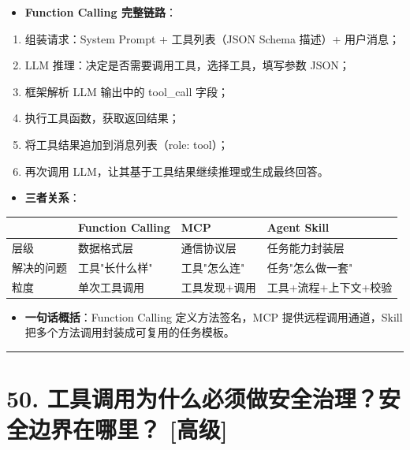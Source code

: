 \documentclass[9pt,a4paper,twocolumn]{ctexart}
\newcommand{\lvgao}{\usebox{\badgegaobox}}
\def\lvgao{[高级]}%
\begin{document}
\begin{itemize}[itemsep=1pt, topsep=2pt]
  \item \textbf{Function Calling 完整链路}：
\end{itemize}
\begin{enumerate}[itemsep=1pt, topsep=2pt]
  \item 组装请求：System Prompt + 工具列表（JSON Schema 描述）+ 用户消息；
  \item LLM 推理：决定是否需要调用工具，选择工具，填写参数 JSON；
  \item 框架解析 LLM 输出中的 tool\_call 字段；
  \item 执行工具函数，获取返回结果；
  \item 将工具结果追加到消息列表（role: tool）；
  \item 再次调用 LLM，让其基于工具结果继续推理或生成最终回答。
\end{enumerate}
\begin{itemize}[itemsep=1pt, topsep=2pt]
  \item \textbf{三者关系}：
\end{itemize}

{\footnotesize
\begin{tabular}{|p{}|p{}|p{}|p{}|}
\hline
\textbf{} & \textbf{Function Calling} & \textbf{MCP} & \textbf{Agent Skill} \\
\hline
层级 & 数据格式层 & 通信协议层 & 任务能力封装层 \\
\hline
解决的问题 & 工具"长什么样" & 工具"怎么连" & 任务"怎么做一套" \\
\hline
粒度 & 单次工具调用 & 工具发现+调用 & 工具+流程+上下文+校验 \\
\hline
\end{tabular}
}


\begin{itemize}[itemsep=1pt, topsep=2pt]
  \item \textbf{一句话概括}：Function Calling 定义方法签名，MCP 提供远程调用通道，Skill 把多个方法调用封装成可复用的任务模板。
\end{itemize}


\vspace{2pt}
\noindent\rule{\columnwidth}{0.3pt}\vspace{2pt}



\section*{50. 工具调用为什么必须做安全治理？安全边界在哪里？ \lvgao{}}
\end{document}
